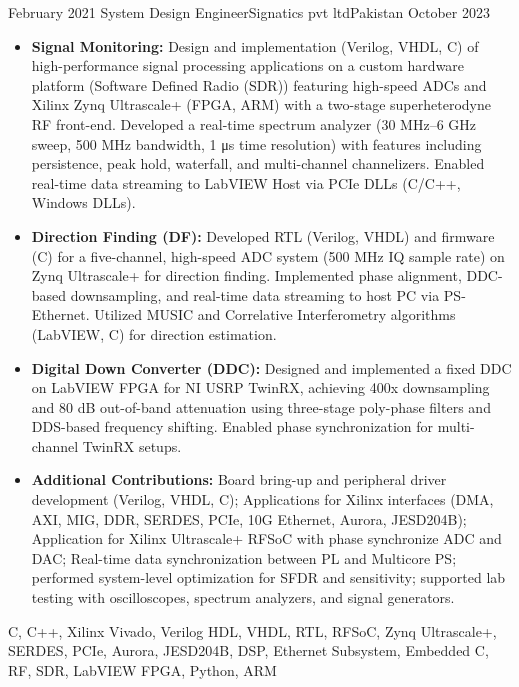 \begin{experiences}
  \experience
  {February 2021}   {System Design Engineer}{Signatics pvt ltd}{Pakistan}
  {October 2023} {
  \begin{itemize}
    \item \textbf{Signal Monitoring:} Design and implementation (Verilog, VHDL, C) of high-performance signal processing applications on a custom hardware platform (Software Defined Radio (SDR)) featuring high-speed ADCs and Xilinx Zynq Ultrascale+ (FPGA, ARM) with a two-stage superheterodyne RF front-end. Developed a real-time spectrum analyzer (30 MHz–6 GHz sweep, 500 MHz bandwidth, 1 μs time resolution) with features including persistence, peak hold, waterfall, and multi-channel channelizers. Enabled real-time data streaming to LabVIEW Host via PCIe DLLs (C/C++, Windows DLLs).
    \item \textbf{Direction Finding (DF):} Developed RTL (Verilog, VHDL) and firmware (C) for a five-channel, high-speed ADC system (500 MHz IQ sample rate) on Zynq Ultrascale+ for direction finding. Implemented phase alignment, DDC-based downsampling, and real-time data streaming to host PC via PS-Ethernet. Utilized MUSIC and Correlative Interferometry algorithms (LabVIEW, C) for direction estimation.
    \item \textbf{Digital Down Converter (DDC):} Designed and implemented a fixed DDC on LabVIEW FPGA for NI USRP TwinRX, achieving 400x downsampling and 80 dB out-of-band attenuation using three-stage poly-phase filters and DDS-based frequency shifting. Enabled phase synchronization for multi-channel TwinRX setups.
  \item \textbf{Additional Contributions:} Board bring-up and peripheral driver development (Verilog, VHDL, C); Applications for Xilinx interfaces (DMA, AXI, MIG, DDR, SERDES, PCIe, 10G Ethernet, Aurora, JESD204B); Application for Xilinx Ultrascale+ RFSoC with phase synchronize ADC and DAC; Real-time data synchronization between PL and Multicore PS; performed system-level optimization for SFDR and sensitivity; supported lab testing with oscilloscopes, spectrum analyzers, and signal generators.
  \end{itemize}
  }
  {C, C++, Xilinx Vivado, Verilog HDL, VHDL, RTL, RFSoC, Zynq Ultrascale+, SERDES, PCIe, Aurora, JESD204B, DSP, Ethernet Subsystem, Embedded C, RF, SDR, LabVIEW FPGA, Python, ARM}
  \emptySeparator
  

\end{experiences}
